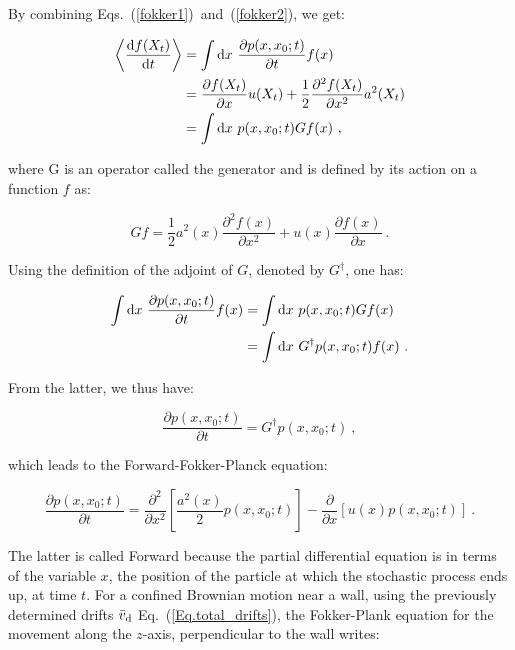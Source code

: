 By combining Eqs.~(\ref{fokker1})~and~(\ref{fokker2}), we get:

\begin{equation}
	\begin{aligned}
		\left\langle \frac{\textnormal{d}f(X_t)}{\textnormal{d}t} \right\rangle &= \int \textnormal{d} x ~\frac{\partial p(x, x_0 ; t) }{\partial t} f(x) \\
		& =  \frac{\partial f(X_t)}{\partial x} u(X_t) + \frac{1}{2} \frac{\partial^2 f(X_t)}{\partial x^2} a^2 (X_t) \\
		& = \int \textnormal{d}x ~ p(x, x_0 ; t) G f(x) ~,
	\end{aligned}
\end{equation}

where G is an operator called the generator and is defined by its action on a function $f$ as:

\begin{equation}
	Gf = \frac{1}{2} a^2 (x) \frac{\partial ^2 f(x)}{\partial x^2} + u(x) \frac{\partial f(x)}{\partial x} ~.
\end{equation}

Using the definition of the adjoint of $G$, denoted by $G ^\dagger$, one has:


\begin{equation}
	\begin{aligned}
		\int \textnormal{d} x ~\frac{\partial p(x, x_0 ; t) }{\partial t} f(x) &= \int \textnormal{d}x ~ p(x, x_0 ; t) G f(x) \\
		&= \int \textnormal{d}x ~  G ^\dagger p(x, x_0 ; t) f(x) ~.
	\end{aligned}
\end{equation}

From the latter, we thus have:

\begin{equation}
	\frac{\partial p(x, x_0 ; t)}{\partial t} = G^\dagger p(x, x_0 ; t) ~,
	\label{fokker3}
\end{equation}

which leads to the Forward-Fokker-Planck equation:

\begin{equation}
	\frac{\partial p(x, x_0 ; t)}{\partial t }= \frac{\partial ^2}{\partial x^2} \left[\frac{a^2 (x)}{2}p(x, x_0 ; t)\right] - \frac{\partial}{\partial x} \left[u(x) p(x, x_0 ; t)\right] ~.
	\label{Eq.Forward_Fokker_plank}
\end{equation}

The latter is called Forward because the partial differential equation is in terms of the variable $x$, the position of the particle at which the stochastic process ends up, at time $t$. For a confined Brownian motion near a wall, using the previously determined drifts $\bar{v}_\textnormal{d}$ Eq.~(\ref{Eq.total_drifts}), the Fokker-Plank equation for the movement along the $z$-axis, perpendicular to the wall writes:

